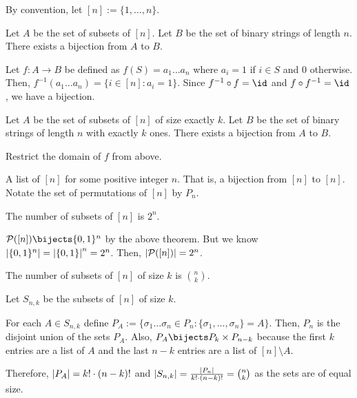 By convention, let $[n] := \{1,\dotsc,n\}$.

\begin{theorem}
  Let $A$ be the set of subsets of $[n]$.
  Let $B$ be the set of binary strings of length $n$.
  There exists a bijection from $A$ to $B$.
\end{theorem}
\begin{prf}
  Let $f : A \to B$ be defined as $f(S) = a_1\dots a_n$
  where $a_i = 1$ if $i \in S$ and $0$ otherwise.
  Then, $f^{-1}(a_1\dots a_n) = \{i \in [n] : a_i = 1\}$.
  Since $f^{-1} \circ f = \id$ and $f \circ f^{-1} = \id$, we have a bijection.
\end{prf}

\begin{theorem}
  Let $A$ be the set of subsets of $[n]$ of size exactly $k$.
  Let $B$ be the set of binary strings of length $n$ with exactly $k$ ones.
  There exists a bijection from $A$ to $B$.
\end{theorem}
\begin{prf}
  Restrict the domain of $f$ from above.
\end{prf}

\begin{defn}[permutation]
  A list of $[n]$ for some positive integer $n$.
  That is, a bijection from $[n]$ to $[n]$.
  Notate the set of permutations of $[n]$ by $P_n$.
\end{defn}

\begin{theorem}[1.3]
  The number of subsets of $[n]$ is $2^n$.
\end{theorem}
\begin{prf}
  $\mathcal{P}([n]) \bijects \{0,1\}^n$ by the above theorem.
  But we know $\abs{\{0,1\}^n} = \abs{\{0,1\}}^n = 2^n$.
  Then, $\abs{\mathcal{P}([n])} = 2^n$.
\end{prf}

\begin{theorem}[1.5]
  The number of subsets of $[n]$ of size $k$ is $\binom{n}{k}$.
\end{theorem}
\begin{prf}
  Let $S_{n,k}$ be the subsets of $[n]$ of size $k$.

  For each $A \in S_{n,k}$ define $P_A := \{\sigma_1\dots\sigma_n \in P_n : \{\sigma_1,\dotsc,\sigma_n\} = A\}$.
  Then, $P_n$ is the disjoint union of the sets $P_A$.
  Also, $P_A \bijects P_k \times P_{n-k}$ because the first $k$ entries are a list of $A$
  and the last $n-k$ entries are a list of $[n] \setminus A$.

  Therefore, $\abs{P_A} = k! \cdot (n-k)!$ and
  $\abs{S_{n,k}} = \frac{\abs{P_n}}{k!\cdot(n-k)!} = \binom{n}{k}$
  as the sets are of equal size.
\end{prf}

